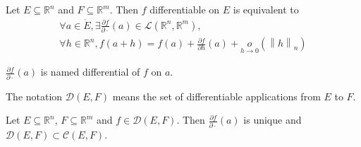 \documentclass[11pt,en]{elegantpaper}
\newcommand{\norm}[1]{\left\lVert#1\right\rVert}
\newcommand{\Real}{\mathbb{R}}
\begin{document}
\begin{definition}
  Let $E \subseteq \Real^n$ and $F \subseteq \Real^m$.
  Then $f$ differentiable on $E$ is equivalent to \begin{equation}\label{def:differentiable}
    \begin{gathered}
      \forall a \in \mathring{E}, \exists \frac{\partial f}{\partial \cdot}(a) \in \mathcal{L}(\Real^n,\Real^m), \\
      \forall h \in \Real^n, f(a+h) = f(a) + \frac{\partial f}{\partial h}(a) + \underset{h \to 0}o(\norm h _n)
    \end{gathered}
  \end{equation}

  $\frac{\partial f}{\partial \cdot}(a)$ is named differential of $f$ on $a$. \par
  The notation $\mathcal{D}(E,F)$ means the set of differentiable applications from $E$ to $F$.
\end{definition}

\begin{proposition}\label{prop:differential_unique}
  {\normalfont Let $E \subseteq \Real^n$, $F \subseteq \Real^m$ and $f \in \mathcal{D}(E,F)$.
  Then $\frac{\partial f}{\partial \cdot}(a)$ is unique and $\mathcal{D}(E,F) \subset \mathcal{C}(E,F)$.}
\end{proposition}
\end{document}

